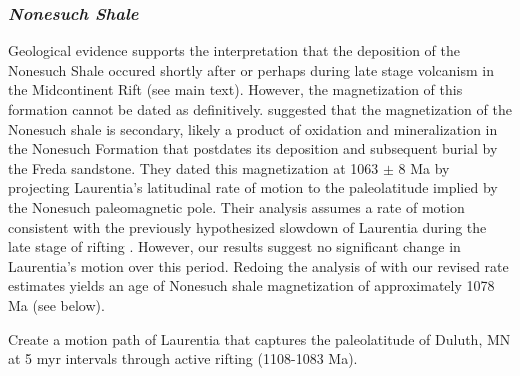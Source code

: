 \documentclass{article}
\begin{document}
\subsubsection{\texorpdfstring{\textit{Nonesuch
Shale}}{Nonesuch Shale}}\label{nonesuch-shale}

Geological evidence supports the interpretation that the deposition of the Nonesuch Shale occured shortly after or perhaps during late stage volcanism in the Midcontinent Rift (see main text). However, the magnetization of this formation
cannot be dated as definitively. \cite{Symons2013a} suggested that the
magnetization of the Nonesuch shale is secondary, likely a product of
oxidation and mineralization in the Nonesuch Formation that postdates
its deposition and subsequent burial by the Freda sandstone. They dated
this magnetization at 1063 \(\pm\) 8 Ma by projecting Laurentia's
latitudinal rate of motion to the paleolatitude implied by the Nonesuch
paleomagnetic pole. Their analysis assumes a rate of motion consistent
with the previously hypothesized slowdown of Laurentia during the late
stage of rifting \citep{Davis1997a}. However, our results suggest
no significant change in Laurentia's motion over this period. Redoing
the analysis of \cite{Symons2013a} with our revised rate estimates
yields an age of Nonesuch shale magnetization of approximately 1078 Ma
(see below).

    Create a motion path of Laurentia that captures the paleolatitude of
Duluth, MN at 5 myr intervals through active rifting (1108-1083 Ma).
\end{document}
